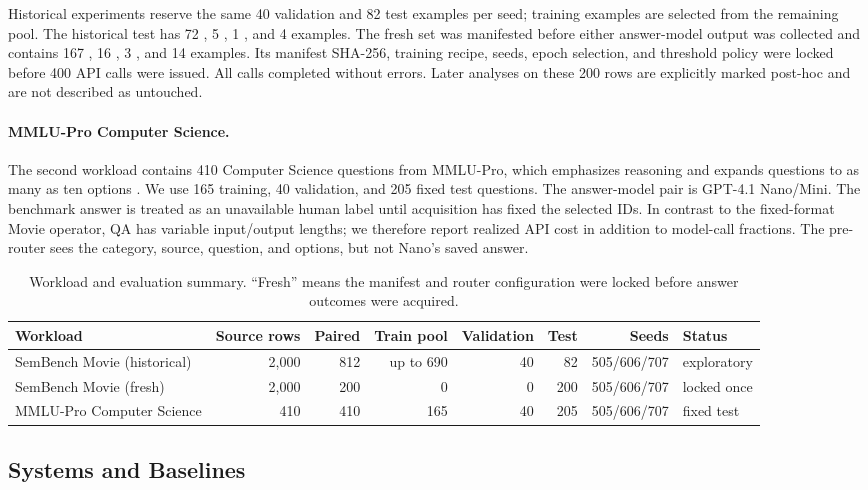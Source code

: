 Historical experiments reserve the same 40 validation and 82 test examples
per seed; training examples are selected from the remaining pool. The
historical test has 72 \bc, 5 \mo, 1 \no, and 4 \bw examples. The fresh set was
manifested before either answer-model output was collected and contains 167
\bc, 16 \mo, 3 \no, and 14 \bw examples. Its manifest SHA-256, training recipe,
seeds, epoch selection, and threshold policy were locked before 400 API calls
were issued. All calls completed without errors. Later analyses on these 200
rows are explicitly marked post-hoc and are not described as untouched.

\paragraph{MMLU-Pro Computer Science.}
The second workload contains 410 Computer Science questions from MMLU-Pro,
which emphasizes reasoning and expands questions to as many as ten options
\cite{wang2024mmlupro}. We use 165 training, 40 validation, and 205 fixed test
questions. The answer-model pair is GPT-4.1 Nano/Mini. The benchmark answer is treated as
an unavailable human label until acquisition has fixed the selected IDs. In
contrast to the fixed-format Movie operator, QA has variable input/output
lengths; we therefore
report realized API cost in addition to model-call fractions. The pre-router
sees the category, source, question, and options, but not Nano's saved answer.

\begin{table}[t]
  \centering
  \small
  \caption{Workload and evaluation summary. ``Fresh'' means the manifest and
  router configuration were locked before answer outcomes were acquired.}
  \label{tab:workloads}
  \begin{tabular}{lrrrrrrl}
    \toprule
    Workload & Source rows & Paired & Train pool & Validation & Test & Seeds & Status\\
    \midrule
    SemBench Movie (historical) & 2,000 & 812 & up to 690 & 40 & 82 & 505/606/707 & exploratory\\
    SemBench Movie (fresh) & 2,000 & 200 & 0 & 0 & 200 & 505/606/707 & locked once\\
    MMLU-Pro Computer Science & 410 & 410 & 165 & 40 & 205 & 505/606/707 & fixed test\\
    \bottomrule
  \end{tabular}
\end{table}

\subsection{Systems and Baselines}

